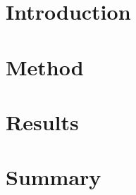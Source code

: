 \section{Introduction}
\lipsum[1]

\section{Method}
\lipsum[2]

\section{Results}
\lipsum[3]

\section{Summary}
\lipsum[4]
